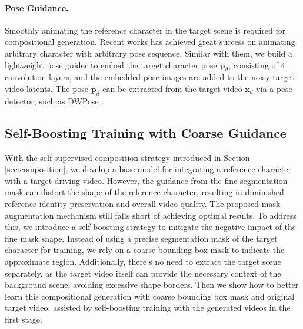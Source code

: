 \paragraph{Pose Guidance.}
Smoothly animating the reference character in the target scene is required for compositional generation.
Recent works \cite{hu2024animate,xu2024magicanimate} has achieved great success on animating arbitrary character with arbitrary pose sequence.
Similar with them, we build a lightweight pose guider to embed the target character pose $\boldsymbol{p}_d$, consisting of 4 convolution layers, and the embedded pose images are added to the noisy target video latents.
The pose $\boldsymbol{p}_d$ can be extracted from the target video $\boldsymbol{x}_d$ via a pose detector, such as DWPose \cite{yang2023effective}.











\subsection{Self-Boosting Training with Coarse Guidance}
\label{sec:self_boost}

With the self-supervised composition strategy introduced in Section \ref{sec:composition}, we develop a base model for integrating a reference character with a target driving video. 
However, the guidance from the fine segmentation mask can distort the shape of the reference character, resulting in diminished reference identity preservation and overall video quality. 
The proposed mask augmentation mechanism still falls short of achieving optimal results. 
To address this, we introduce a self-boosting strategy to mitigate the negative impact of the fine mask shape. 
Instead of using a precise segmentation mask of the target character for training, we rely on a coarse bounding box mask to indicate the approximate region. 
Additionally, there's no need to extract the target scene separately, as the target video itself can provide the necessary context of the background scene, avoiding excessive shape borders. 
Then we show how to better learn this compositional generation with coarse bounding box mask and original target video, assisted by self-boosting training with the generated videos in the first stage.

